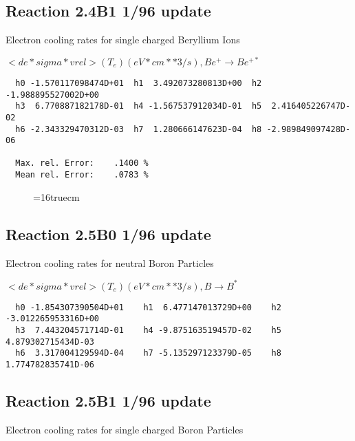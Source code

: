 \documentclass[12pt]{article}
\begin{document}
\subsection{
Reaction 2.4B1                     1/96 update
}

  Electron cooling rates for single
  charged Beryllium Ions

 $<de*sigma*vrel>(T_e)  (eV*cm**3/s), Be^+ \rightarrow Be^{+*} $

\begin{small}\begin{verbatim}
  h0 -1.570117098474D+01  h1  3.492073280813D+00  h2 -1.988895527002D+00
  h3  6.770887182178D-01  h4 -1.567537912034D-01  h5  2.416405226747D-02
  h6 -2.343329470312D-03  h7  1.280666147623D-04  h8 -2.989849097428D-06

  Max. rel. Error:    .1400 %
  Mean rel. Error:    .0783 %

\end{verbatim}\end{small}

\begin{figure} \label{2.4Bl}
\epsfxsize=16truecm
\end{figure}
\newpage

\subsection{
Reaction 2.5B0                     1/96 update
}

 Electron cooling rates for neutral
 Boron Particles

$ <de*sigma*vrel>(T_e)  (eV*cm**3/s), B   \rightarrow B^* $


\begin{small}\begin{verbatim}
  h0 -1.854307390504D+01    h1  6.477147013729D+00    h2 -3.012265953316D+00
  h3  7.443204571714D-01    h4 -9.875163519457D-02    h5  4.879302715434D-03
  h6  3.317004129594D-04    h7 -5.135297123379D-05    h8  1.774782835741D-06
\end{verbatim}\end{small}

\subsection{
Reaction 2.5B1                     1/96 update
}

 Electron cooling rates for single
 charged Boron Particles
\end{document}
